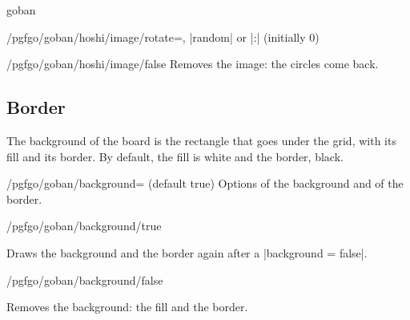 \begin{environment}{{goban}}
\begin{key}{/pgfgo/goban/hoshi/image/rotate=, |random| or |:| (initially 0)}
		\begin{codeexample}[]
			\begin{goban}[9, hoshi = {image = {file = pgfgo-hoshi.png, width = 8pt}}]
			\end{goban}

			\begin{goban}[9, hoshi = {image = {file = pgfgo-hoshi.png, width = 8pt, rotate = 45}}]
			\end{goban}
		\end{codeexample}
	\end{key}

	\begin{stylekey}{/pgfgo/goban/hoshi/image/false}
		Removes the image: the circles come back.
	\end{stylekey}

	\subsection{Border}

	The background of the board is the rectangle that goes under the grid, with its fill and its border. By default, the fill is white and the border, black.

	\begin{key}{/pgfgo/goban/background= (default true)}
		Options of the background and of the border.
	\end{key}

	\begin{stylekey}{/pgfgo/goban/background/true}

		Draws the background and the border again after a |background = false|.
	\end{stylekey}

	\begin{stylekey}{/pgfgo/goban/background/false}

		Removes the background: the fill and the border.

		\begin{codeexample}[]

			\begin{goban}[name = a]
			\end{goban}

			\begin{goban}[background = false, resume = a]
			\end{goban}
		\end{codeexample}
	\end{stylekey}


\end{environment}
